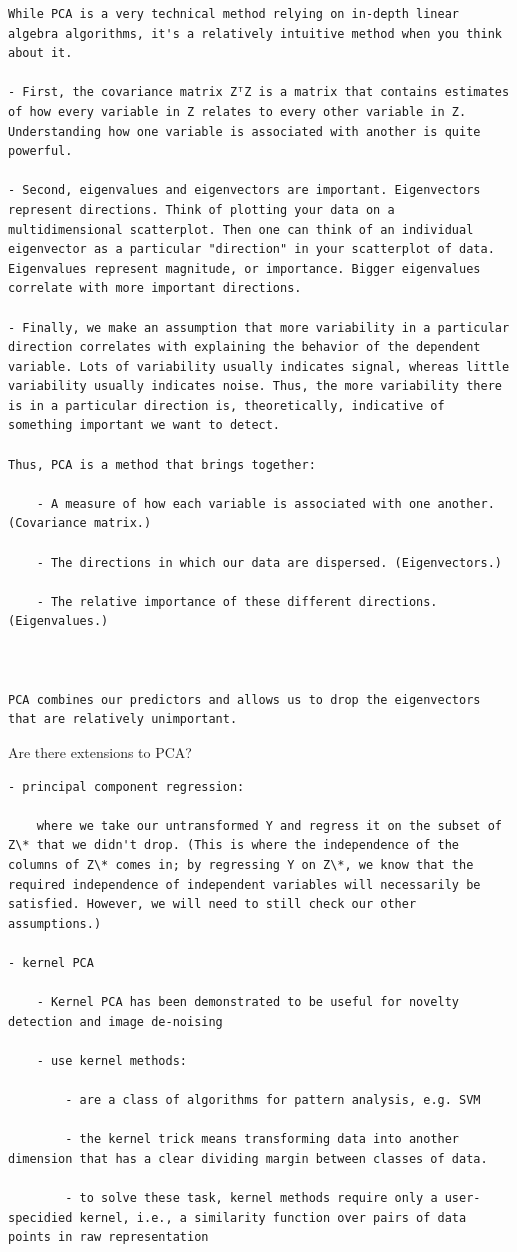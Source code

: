 \documentclass[
]{book}
\begin{document}
\begin{verbatim}
While PCA is a very technical method relying on in-depth linear algebra algorithms, it's a relatively intuitive method when you think about it.

- First, the covariance matrix ZᵀZ is a matrix that contains estimates of how every variable in Z relates to every other variable in Z. Understanding how one variable is associated with another is quite powerful.

- Second, eigenvalues and eigenvectors are important. Eigenvectors represent directions. Think of plotting your data on a multidimensional scatterplot. Then one can think of an individual eigenvector as a particular "direction" in your scatterplot of data. Eigenvalues represent magnitude, or importance. Bigger eigenvalues correlate with more important directions.

- Finally, we make an assumption that more variability in a particular direction correlates with explaining the behavior of the dependent variable. Lots of variability usually indicates signal, whereas little variability usually indicates noise. Thus, the more variability there is in a particular direction is, theoretically, indicative of something important we want to detect.

Thus, PCA is a method that brings together:

    - A measure of how each variable is associated with one another. (Covariance matrix.)

    - The directions in which our data are dispersed. (Eigenvectors.)

    - The relative importance of these different directions. (Eigenvalues.)



PCA combines our predictors and allows us to drop the eigenvectors that are relatively unimportant.
\end{verbatim}

Are there extensions to PCA?

\begin{verbatim}
- principal component regression:

    where we take our untransformed Y and regress it on the subset of Z\* that we didn't drop. (This is where the independence of the columns of Z\* comes in; by regressing Y on Z\*, we know that the required independence of independent variables will necessarily be satisfied. However, we will need to still check our other assumptions.)

- kernel PCA

    - Kernel PCA has been demonstrated to be useful for novelty detection and image de-noising

    - use kernel methods:

        - are a class of algorithms for pattern analysis, e.g. SVM

        - the kernel trick means transforming data into another dimension that has a clear dividing margin between classes of data.

        - to solve these task, kernel methods require only a user-specidied kernel, i.e., a similarity function over pairs of data points in raw representation
\end{verbatim}
\end{document}
